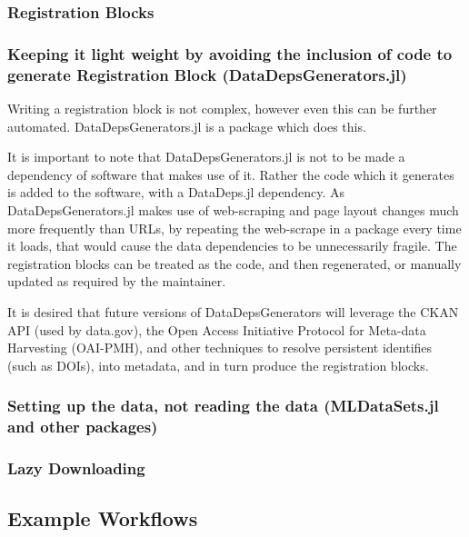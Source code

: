 \documentclass{jors}
\begin{document}
\subsubsection{Registration Blocks}



\subsubsection{Keeping it light weight by avoiding the inclusion of code to generate Registration Block (DataDepsGenerators.jl)}
Writing a registration block is not complex, however even this can be further automated.
DataDepsGenerators.jl is a package which does this.



It is important to note that DataDepsGenerators.jl is not to be made a dependency of software that makes use of it.
Rather the code which it generates is added to the software, with a DataDeps.jl dependency.
As DataDepsGenerators.jl makes use of web-scraping and page layout changes much more frequently than URLs,
by repeating the web-scrape in a package every time it loads, that would cause the data dependencies to be unnecessarily fragile.
The registration blocks can be treated as the code, and then regenerated, or manually updated as required by the maintainer.





It is desired that future versions of DataDepsGenerators will leverage the CKAN API (used by data.gov), the Open Access Initiative Protocol for Meta-data Harvesting (OAI-PMH), and other techniques to resolve persistent identifies (such as DOIs), into metadata, and in turn produce the registration blocks.


\subsubsection{Setting up the data, not reading the data (MLDataSets.jl and other packages)}

\subsubsection{Lazy Downloading}


\subsection{Example Workflows}
\end{document}
